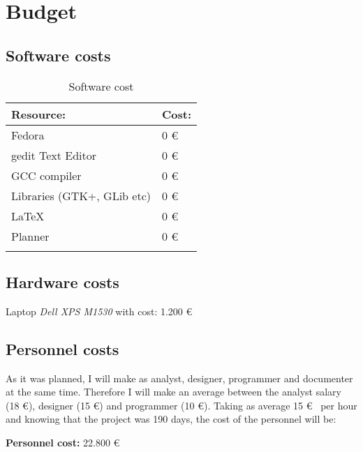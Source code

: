 
\chapter{Budget}

\section{Software costs}\label{sec:SoftwareCosts}

\begin{table}[H]
  \begin{center}
    \begin{tabularx}{0.75\textwidth}{|X|X|}
      \firsthline
      \textbf{Resource:} & \textbf{Cost:} \\
      \hline
      Fedora & 0 \euro \\
      \hline
      gedit Text Editor & 0 \euro \\
      \hline
      GCC compiler & 0 \euro \\
      \hline
      Libraries (GTK+, GLib etc) & 0 \euro \\
      \hline
      \LaTeX & 0 \euro \\
      \hline
      Planner & 0 \euro \\
      \lasthline
    \end{tabularx}
    \caption{Software cost}
  \end{center}
\end{table}

\section{Hardware costs}\label{sec:HardwareCosts}

Laptop \emph{Dell XPS M1530} with cost: 1.200 \euro

\newpage
\section{Personnel costs}\label{sec:PersonnelCosts}

As it was planned, I will make as analyst, designer, programmer and documenter at the same time. Therefore I will make an average between the analyst salary (18 \euro), designer (15 \euro) and programmer (10 \euro). Taking as average 15 \euro~ per hour and knowing that the project was 190 days, the cost of the personnel will be:

\textbf{Personnel cost:} 22.800 \euro
